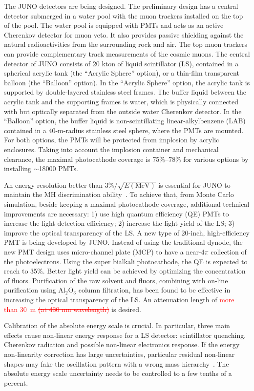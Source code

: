 \documentclass[aps,twocolumn,preprintnumbers,amsmath,superscriptaddress,amssymb,floats,nofootinbib]{revtex4-1}
\begin{document}
The JUNO detectors are being designed. The preliminary design has a central detector submerged in a water pool with the muon trackers installed on the top of the pool. 
The water pool is equipped with PMTs and acts as an active Cherenkov detector for muon veto. 
It also provides passive shielding against the natural radioactivities from the surrounding rock and air. 
The top muon trackers can provide complementary track measurements of the cosmic muons. 
The central detector of JUNO consists of 20 kton of liquid scintillator (LS), contained in a spherical acrylic tank (the ``Acrylic Sphere'' option), or a thin-film transparent balloon (the ``Balloon'' option). 
In the ``Acrylic Sphere'' option, the acrylic tank is supported by double-layered stainless steel frames. 
The buffer liquid between the acrylic tank and the supporting frames is water, which is physically connected with but optically separated from the outside water Cherenkov detector. 
In the ``Balloon'' option, the buffer liquid is non-scintillating linear-alkylbenzene (LAB) contained in a 40-m-radius stainless steel sphere, where the PMTs are mounted. 
For both options, the PMTs will be protected from implosion by acrylic enclosures. 
Taking into account the implosion container and mechanical clearance, the maximal photocathode coverage is 75\%--78\% for various options by installing $\sim$18000 PMTs.

An energy resolution better than $3\%/\sqrt{E(\textrm{MeV})}$ is essential for JUNO to maintain the MH discrimination ability~\cite{Li-PRD13}. 
To achieve that, from Monte Carlo simulation, beside keeping a maximal photocathode coverage, additional technical improvements are necessary: 
1) use high quantum efficiency (QE) PMTs to increase the light detection efficiency;
2) increase the light yield of the LS;
3) improve the optical transparency of the LS.
A new type of 20-inch, high-efficiency PMT is being developed by JUNO. Instead of using the traditional dynode, the new PMT design uses micro-channel plate (MCP) to have a near-4$\pi$ collection of the photoelectrons. 
Using the super bialkali photocathode, the QE is expected to reach to 35\%. 
Better light yield can be achieved by optimizing the concentration of fluors. 
Purification of the raw solvent and fluors, combining with on-line purification using Al$_2$O$_3$ column filtration, has been found to be effective in increasing the optical transparency of the LS. An attenuation length of \textcolor{red}{more than 30~m \st{(at 430 nm wavelength)}} is desired.

Calibration of the absolute energy scale is crucial. 
In particular, three main effects cause non-linear energy response for a LS detector: scintillator quenching, Cherenkov radiation and possible non-linear electronics response. 
If the energy non-linearity correction has large uncertainties, particular residual non-linear shapes may fake the oscillation pattern with a wrong mass hierarchy~\cite{Qian-PRD13}. 
The absolute energy scale uncertainty needs to be controlled to a few tenths of a percent.
\end{document}
